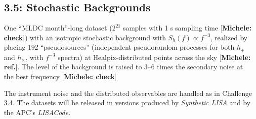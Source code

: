 \documentclass[11pt]{article}
\begin{document}
\subsection*{3.5: Stochastic Backgrounds}

One ``MLDC month''-long dataset ($2^{21}$ samples with 1 s sampling time [\textbf{Michele: check}]) with an isotropic stochastic background with $S_h(f) \propto f^{-3}$, realized by placing 192 ``pseudosources'' (independent pseudorandom processes for both $h_+$ and $h_\times$, with $f^{-3}$ spectra) at Healpix-distributed points across the sky [\textbf{Michele: ref.}]. The level of the background is raised to 3--6 times the secondary noise at the best frequency [\textbf{Michele: check}]

The instrument noise and the distributed observables are handled as in Challenge 3.4. The datasets will be released in versions produced by \emph{Synthetic LISA} and by the APC's \emph{LISACode}.
\end{document}
